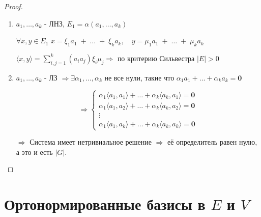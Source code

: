 \documentclass[12px]{report}
\begin{document}
\vspace{0.2cm}
\begin{proof}
\leavevmode \newline
    \begin{enumerate}
        \item ${a_{1}, \ldots, a_{k}}$ - ЛНЗ, \quad $E_{1} = \alpha(a_{1}, \ldots, a_{k})$ 
        \newline 
        
        $\forall x, y \in E_{1}$ \quad  $x = \xi_{1} a_{1} \; + \; \ldots \; + \; \xi_{k} a_{k}, \quad y = \mu_{1} a_{1} \; + \; \ldots \; + \; \mu_{k} a_{k}$ 
        \newline 
        
        $\langle x, y \rangle = \sum\limits_{i, j = 1}^{k} (a_{i} a_{j}) \xi_{i} \mu_{j} \Longrightarrow$ по критерию Сильвестра $|E| > 0$
        \newline 
        
        \item ${a_{1}, \ldots, a_{k}}$ - ЛЗ \; $\Longrightarrow \exists \alpha_{1}, \ldots, \alpha_{k}$ не все нули, такие что $\alpha_{1} a_{1} + \ldots + \alpha_{k} a_{k} = \boldsymbol{0}$
        \newline
        
        
    \[
    \Longrightarrow
        \begin{cases}
            \alpha_{1} \langle a_1, a_{1} \rangle + \ldots + \alpha_{k} \langle a_{k}, a_{1} \rangle = \mathbf{0} \\
            \alpha_{1} \langle a_{1}, a_{2} \rangle + \ldots + \alpha_{k} \langle a_{k}, a_{2} \rangle = \mathbf{0} \\
            \vdots \\
            
            \alpha_{1} \langle a_{1}, a_{k} \rangle + \ldots + \alpha_{k} \langle a_{k}, a_{k} \rangle = \mathbf{0}
        \end{cases}
    \]
    \newline
    
    $\Longrightarrow$ Система имеет нетривиальное решение $\Longrightarrow$ её определитель равен нулю, а это и есть $|G|.$
    \end{enumerate}
\end{proof}

\clearpage

\section{Ортонормированные базисы в $E$ и $V$}
\end{document}

